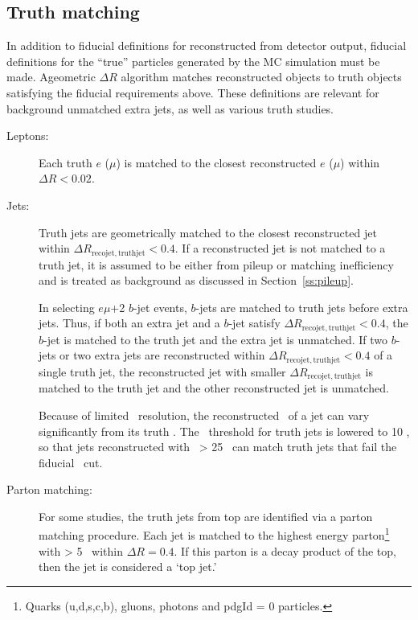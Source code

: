 \subsection{Truth matching}
In addition to fiducial definitions for reconstructed from detector output, fiducial definitions for the ``true'' particles generated by the MC simulation must be made.
\label{ss:tmatching}
Ageometric $\Delta R$ algorithm matches reconstructed objects to truth objects satisfying the fiducial requirements above. These definitions are relevant for background unmatched extra jets, as well as various truth studies.
\begin{description}
\item[Leptons:] Each truth $e$ ($\mu$) is matched to the closest reconstructed $e$ ($\mu$) within $\Delta R < 0.02$.
\item[Jets:] Truth jets are geometrically matched to the closest reconstructed jet within $\Delta R_{\mathrm{reco jet, truth jet}} < 0.4$. If a reconstructed jet is not matched to a truth jet, it is assumed to be either from pileup or matching inefficiency and is treated as background as discussed in Section~\ref{ss:pileup}.

In selecting $e\mu$+2 $b$-jet events, $b$-jets are matched to truth jets before extra jets. Thus, if both an extra jet and a $b$-jet satisfy $\Delta R_{\mathrm{reco jet, truth jet}}<0.4$, the $b$-jet is matched to the truth jet and the extra jet is unmatched. If two $b$-jets or two extra jets are reconstructed within $\Delta R_{\mathrm{reco jet, truth jet}}<0.4$ of a single truth jet, the reconstructed jet with smaller $\Delta R_{\mathrm{reco jet, truth jet}}$ is matched to the truth jet and the other reconstructed jet is unmatched.

Because of limited \pt\ resolution, the reconstructed \pt\ of a jet can vary significantly from its truth \pt. The \pt\ threshold for truth jets is lowered to 10 \GeV, so that jets reconstructed with \pt\ > 25 \GeV\ can match truth jets that fail the fiducial \pt\ cut. 



\item[Parton matching:] For some studies, the truth jets from top are identified via a parton matching procedure. Each jet is matched to the highest energy parton\footnote{Quarks (u,d,s,c,b), gluons, photons and pdgId = 0 particles.} with \pt > 5 \GeV\ within $\Delta R = 0.4$. If this parton is a decay product of the top, then the jet is considered a `top jet.'
\end{description}
